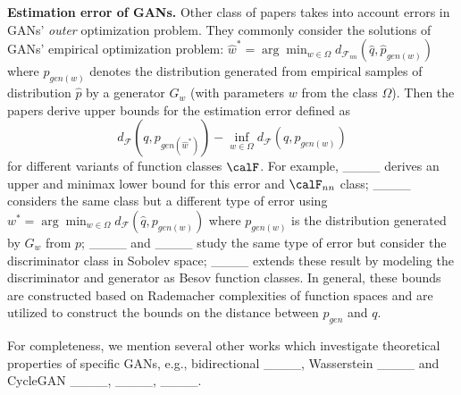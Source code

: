 \textbf{Estimation error of GANs.} Other class of papers takes into account errors in GANs' \textit{outer} optimization problem. They commonly consider the solutions of GANs' empirical optimization problem:
$\widehat{w}^* = \arg\min_{w\in \Omega} d_{\mathcal{F}_{nn}}(\widehat{q},\widehat{p}_{gen(w)})
$ where $\widehat{p}_{gen(w)}$ denotes the distribution generated from empirical samples of distribution $\widehat{p}$ by a generator $G_{w}$ (with parameters $w$ from the class $\Omega$). Then the papers derive upper bounds for the estimation error defined as
$$
d_{\mathcal{F}}(q, p_{gen(\widehat{w}^*)}) - \inf_{w\in \Omega} d_{\mathcal{F}}(q, p_{gen(w)})
$$
for different variants of function classes $\calF$.
For example, ____ derives an upper and minimax lower bound for this error and $\calF_{nn}$ class; ____ considers the same class but a different type of error using $w^*=\arg\min_{w\in \Omega} d_{\mathcal{F}}(\widehat{q},p_{gen(w)})$ where $p_{gen(w)}$ is the distribution generated by $G_w$ from $p$; ____ and ____ study the same type of error but consider the discriminator class in Sobolev space; ____ extends these result by modeling the discriminator and generator as Besov function classes. In general, these bounds are constructed based on Rademacher complexities of function spaces and are utilized to construct the bounds on the distance between $p_{gen}$ and $q$.

For completeness, we mention several other works which investigate theoretical properties of specific GANs, e.g., bidirectional ____, Wasserstein ____ and CycleGAN ____, ____, ____.